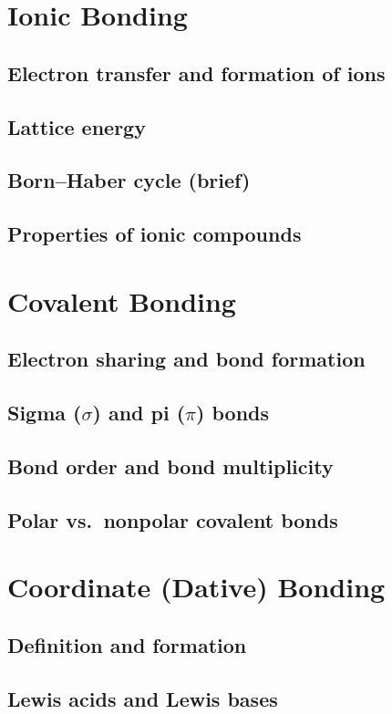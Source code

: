 \documentclass[11pt]{article}
\begin{document}
\section{Ionic Bonding}
	\subsection{Electron transfer and formation of ions}
	\subsection{Lattice energy}
	\subsection{Born--Haber cycle (brief)}
	\subsection{Properties of ionic compounds}

\section{Covalent Bonding}
	\subsection{Electron sharing and bond formation}
	\subsection{\texorpdfstring{Sigma ($\sigma$) and pi ($\pi$) bonds}{Sigma and pi bonds}}
	\subsection{Bond order and bond multiplicity}
	\subsection{Polar vs.\ nonpolar covalent bonds}

\section{Coordinate (Dative) Bonding}
	\subsection{Definition and formation}
	\subsection{Lewis acids and Lewis bases}
\end{document}
